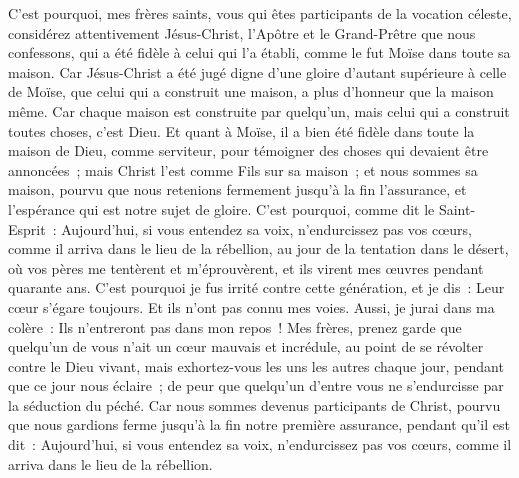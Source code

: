 \begin{multicols}{2}
\VerseOne{}C'est pourquoi, mes frères saints, vous qui êtes participants de la vocation céleste, considérez attentivement Jésus-Christ, l'Apôtre et le Grand-Prêtre que nous confessons,
qui a été fidèle à celui qui l'a établi, comme le fut Moïse dans toute sa maison.
Car Jésus-Christ a été jugé digne d'une gloire d'autant supérieure à celle de Moïse, que celui qui a construit une maison, a plus d'honneur que la maison même.
Car chaque maison est construite par quelqu'un, mais celui qui a construit toutes choses, c'est Dieu.
Et quant à Moïse, il a bien été fidèle dans toute la maison de Dieu, comme serviteur, pour témoigner des choses qui devaient être annoncées~;
mais Christ l'est comme Fils sur sa maison~; et nous sommes sa maison, pourvu que nous retenions fermement jusqu'à la fin l'assurance, et l'espérance qui est notre sujet de gloire.
C'est pourquoi, comme dit le Saint-Esprit~: Aujourd'hui, si vous entendez sa voix,
n'endurcissez pas vos cœurs, comme il arriva dans le lieu de la rébellion, au jour de la tentation dans le désert,
où vos pères me tentèrent et m'éprouvèrent, et ils virent mes œuvres pendant quarante ans.
C'est pourquoi je fus irrité contre cette génération, et je dis~: Leur cœur s'égare toujours. Et ils n'ont pas connu mes voies.
Aussi, je jurai dans ma colère~: Ils n'entreront pas dans mon repos~!
Mes frères, prenez garde que quelqu'un de vous n'ait un cœur mauvais et incrédule, au point de se révolter contre le Dieu vivant,
mais exhortez-vous les uns les autres chaque jour, pendant que ce jour nous éclaire~; de peur que quelqu'un d'entre vous ne s'endurcisse par la séduction du péché.
Car nous sommes devenus participants de Christ, pourvu que nous gardions ferme jusqu'à la fin notre première assurance,
pendant qu'il est dit~: Aujourd'hui, si vous entendez sa voix, n'endurcissez pas vos cœurs, comme il arriva dans le lieu de la rébellion.

\end{multicols}
